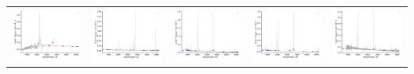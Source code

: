 \begin{center}
\begin{longtable}{l l l l l }
    \includegraphics[width=0.19\linewidth, clip]{Figs/Figs-sdss/spec-9207-57667-0050-STRIPE82-0148-001139.pdf} & \includegraphics[width=0.19\linewidth, clip]{Figs/Figs-sdss/spec-0406-51900-0604-STRIPE82-0054-040145.pdf} & \includegraphics[width=0.19\linewidth, clip]{Figs/Figs-sdss/spec-0408-51821-0296-STRIPE82-0057-019420.pdf} & \includegraphics[width=0.19\linewidth, clip]{Figs/Figs-sdss/spec-0409-51871-0225-STRIPE82-0059-048815.pdf} & \includegraphics[width=0.19\linewidth, clip]{Figs/Figs-sdss/spec-0409-51871-0596-STRIPE82-0062-010774.pdf} \\

\end{longtable}
\end{center}
